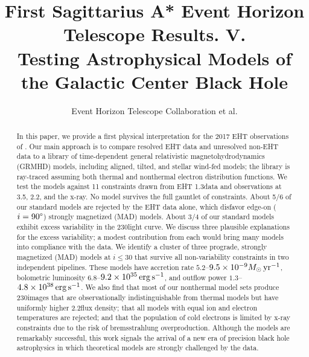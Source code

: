 \documentclass[twocolumn,twocolappendix,tighten,dvipsnames,linenumbers]{aastex63}
\begin{document}
\title{First Sagittarius A* Event Horizon Telescope Results. V.\\
  Testing Astrophysical Models of the Galactic Center Black Hole}

%
\author{Event Horizon Telescope Collaboration et al.}


\received{\today}
\revised{\today}

\begin{abstract}

  In this paper, we provide a first physical interpretation for the 2017 EHT observations of \sgra.  Our main approach is to compare resolved EHT data and unresolved non-EHT data to a library of time-dependent general relativistic magnetohydrodynamics (GRMHD) models, including aligned, tilted, and stellar wind-fed models; the library is ray-traced assuming both thermal and nonthermal electron distribution functions. We test the models against 11 constraints drawn from EHT 1.3\mm data and observations at 3.5\mm, 2.2\um, and the x-ray.  No model survives the full gauntlet of constraints. About 5/6 of our standard models are rejected by the EHT data alone, which disfavor edge-on ($i = 90\degree$) strongly magnetized (MAD) models.  About 3/4 of our standard models exhibit excess variability in the 230\GHz light curve.  We discuss three plausible explanations for the excess variability; a modest contribution from each would bring many models into compliance with the data.  We identify a cluster of three prograde, strongly magnetized (MAD) models at $i \le 30$ that survive all non-variability constraints in two independent pipelines.  These models have accretion rate $5.2$--$9.5\times10^{-9}M_\odot\,\mathrm{yr}^{-1}$, bolometric luminosity $6.8$--$9.2\times10^{35}\,\mathrm{erg\,s^{-1}}$, and outflow power $1.3$--$4.8\times10^{38}\,\mathrm{erg\,s^{-1}}$.  We also find that most of our nonthermal model sets produce 230\GHz images that are observationally indistinguishable from thermal models but have uniformly higher 2.2\um flux density; that all models with equal ion and electron temperatures are rejected; and that the population of cold electrons is limited by x-ray constraints due to the risk of bremsstrahlung overproduction.  Although the models are remarkably successful, this work signals the arrival of a new era of precision black hole astrophysics in which theoretical models are strongly challenged by the data.
  
\end{abstract}
\end{document}
